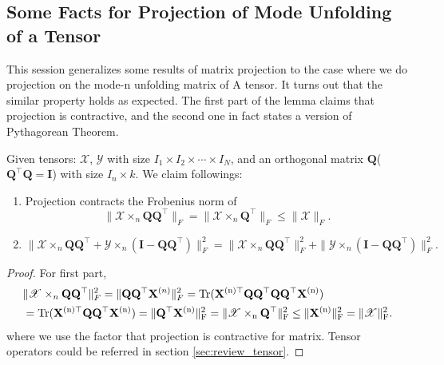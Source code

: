 \subsection{Some Facts for Projection of Mode Unfolding of a Tensor}
This session generalizes some results of matrix projection to the case where we do projection on the mode-n unfolding matrix of A tensor. It turns out that the similar property holds as expected. The first part of the lemma claims that projection is contractive, and the second one in fact states a version of Pythagorean Theorem.
\begin{lem}
\label{lemma:projection_tensors}
Given tensors: $\mathscr{X}$, $\mathscr{Y}$ with size $I_1\times I_2 \times \cdots \times I_N$, and an orthogonal matrix $\mathbf{Q}$($\mathbf{Q}^\top \mathbf{Q} = \mathbf{I}$) with size $I_n\times k$. We claim followings:
\begin{enumerate}
\item Projection contracts the Frobenius norm of 
\begin{equation}
\|\mathscr{X} \times_n \mathbf{Q}\mathbf{Q}^\top\|_F = \|\mathscr{X} \times_n \mathbf{Q}^\top\|_F\le \|\mathscr{X}\|_F.
\end{equation}
\item 
\begin{equation}
\|\mathscr{X} \times_n \mathbf{Q}\mathbf{Q}^\top + \mathscr{Y}\times_n (\mathbf{I}-\mathbf{Q}\mathbf{Q}^\top)\|_F^2 = \|\mathscr{X} \times_n \mathbf{Q}\mathbf{Q}^\top\|_F^2+\|\mathscr{Y}\times_n (\mathbf{I}-\mathbf{Q}\mathbf{Q}^\top)\|_F^2. 
\end{equation}
\end{enumerate}
\begin{proof}
For first part, 
\begin{equation}
\begin{aligned}
&\|\mathscr{X} \times_n \mathbf{Q}\mathbf{Q}^\top\|_F^2 = \|\mathbf{Q}\mathbf{Q}^\top \mathbf{X}^{(n)} \|_F^2 = \rm{Tr}(\mathbf{X}^{(n)\top}\mathbf{Q}\mathbf{Q}^\top \mathbf{Q}\mathbf{Q}^\top \mathbf{X}^{(n)} )\\
&=\rm{Tr}(\mathbf{X}^{(n)\top}\mathbf{Q}\mathbf{Q}^\top \mathbf{X}^{(n)} ) =\|\mathbf{Q}^\top \mathbf{X}^{(n)}\|_F^2 = \|\mathscr{X} \times_n \mathbf{Q}^\top\|_F^2 \le \|\mathbf{X}^{(n)}\|_F^2 = \|\mathscr{X}\|_F^2. 
\end{aligned}
\end{equation}
where we use the factor that projection is contractive for matrix. Tensor operators could be referred in section \ref{sec:review_tensor}.  \par 

\end{proof}
\end{lem}
